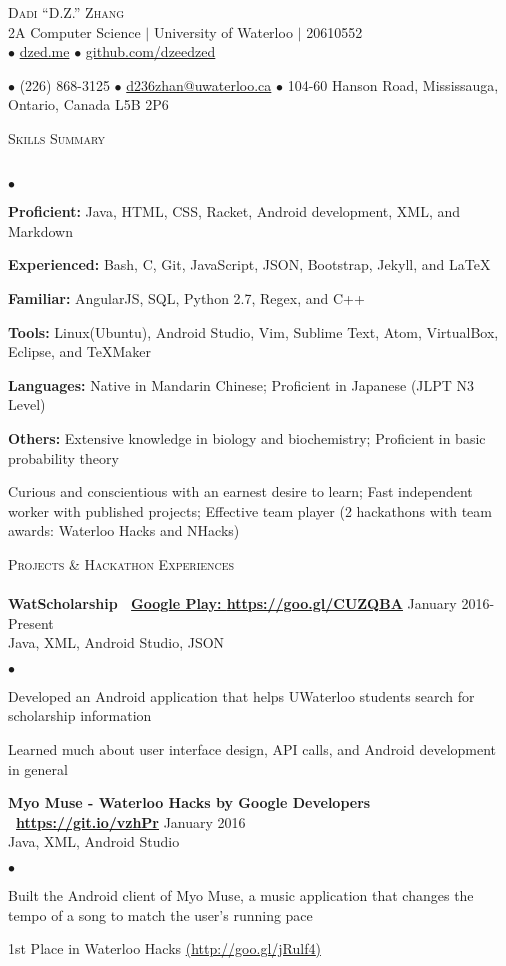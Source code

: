 \documentclass{article}
\newcommand{\lineunder}{\vspace*{-8pt} \\ \hspace*{-18pt} \hrulefill \\}
\newcommand{\header}[1]{{\hspace*{-15pt}\vspace*{6pt} \textsc{#1}} \vspace*{-6pt} \lineunder}
\newcommand{\employer}[3]{{ \textbf{#1} \hfill #2\\ {#3}\\  }}
\newcommand{\contact}[3]{
\begin{center}
{}
\end{center}
\vspace*{-8pt}
\begin{center}
{\LARGE \scshape {#1}}\\
#2\\
#3
\end{center}
\vspace*{-8pt}
}
\newenvironment{achievements}{\begin{list}{$\bullet$}{\topsep 0pt \itemsep -2pt}}{\vspace*{4pt}\end{list}}
\begin{document}
\small
\smallskip
\vspace*{-80pt}

\contact{Dadi ``D.Z.'' Zhang}
{2A Computer Science $\vert$ University of Waterloo $\vert$ 20610552}
{$\bullet$ \href{http://dzed.me}{dzed.me}
$\bullet$ \href{http://github.com/dzeedzed}{github.com/dzeedzed}}
{$\bullet$ (226) 868-3125
$\bullet$ \href{mailto:d236zhan@uwaterloo.ca}{d236zhan@uwaterloo.ca}
$\bullet$ 104-60 Hanson Road, Mississauga, Ontario, Canada L5B 2P6}

\hfill \break
\header{Skills Summary}
\begin{achievements}
\item \textbf{Proficient:} Java, HTML, CSS, Racket, Android development, XML, and Markdown
\item \textbf{Experienced:} Bash, C, Git, JavaScript, JSON, Bootstrap, Jekyll, and  \LaTeX\
\item \textbf{Familiar:} AngularJS, SQL, Python 2.7, Regex, and C++
\item \textbf{Tools:} Linux(Ubuntu), Android Studio, Vim, Sublime Text, Atom, VirtualBox, Eclipse, and TeXMaker
\item \textbf{Languages:} Native in Mandarin Chinese; Proficient in Japanese (JLPT N3 Level)
\item \textbf{Others:} Extensive knowledge in biology and biochemistry; Proficient in basic probability theory
\item Curious and conscientious with an earnest desire to learn; Fast independent worker with published projects; Effective team player (2 hackathons with team awards: Waterloo Hacks and NHacks)
\end{achievements}

\header{Projects \& Hackathon Experiences}

\employer{WatScholarship \hspace{5pt} \Mundus~\href{https://goo.gl/CUZQBA}{Google Play: \underline{https://goo.gl/CUZQBA}}}{January 2016-Present}{Java, XML, Android Studio, JSON}
	\begin{achievements}
	\item Developed an Android application that helps UWaterloo students search for scholarship information
	\item Learned much about user interface design, API calls, and Android development in general
	\end{achievements}

\employer{Myo Muse - Waterloo Hacks by Google Developers \Mundus~\href{https://git.io/vzhPr}{\underline{https://git.io/vzhPr}}}{January 2016}{Java, XML, Android Studio}
	\begin{achievements}
	\item Built the Android client of Myo Muse, a music application that changes the tempo of a song to match the user's running pace
	\item 1st Place in Waterloo Hacks \href{http://goo.gl/jRulf4}{(\underline{http://goo.gl/jRulf4})}
	\end{achievements}
	
\end{document}
